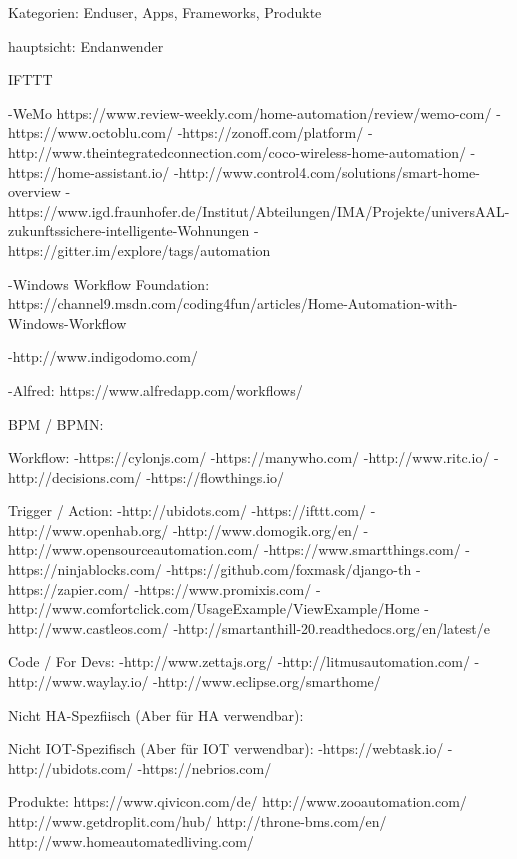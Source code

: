 Kategorien: Enduser, Apps, Frameworks, Produkte

hauptsicht: Endanwender

IFTTT


-WeMo https://www.review-weekly.com/home-automation/review/wemo-com/
-https://www.octoblu.com/
-https://zonoff.com/platform/
-http://www.theintegratedconnection.com/coco-wireless-home-automation/
-https://home-assistant.io/
-http://www.control4.com/solutions/smart-home-overview
-https://www.igd.fraunhofer.de/Institut/Abteilungen/IMA/Projekte/universAAL-zukunftssichere-intelligente-Wohnungen 
-https://gitter.im/explore/tags/automation

-Windows Workflow Foundation: https://channel9.msdn.com/coding4fun/articles/Home-Automation-with-Windows-Workflow


-http://www.indigodomo.com/

-Alfred: https://www.alfredapp.com/workflows/

BPM / BPMN:

Workflow:
-https://cylonjs.com/
-https://manywho.com/
-http://www.ritc.io/
-http://decisions.com/
-https://flowthings.io/

Trigger / Action:
-http://ubidots.com/
-https://ifttt.com/
-http://www.openhab.org/
-http://www.domogik.org/en/
-http://www.opensourceautomation.com/
-https://www.smartthings.com/
-https://ninjablocks.com/
-https://github.com/foxmask/django-th
-https://zapier.com/
-https://www.promixis.com/
-http://www.comfortclick.com/UsageExample/ViewExample/Home
-http://www.castleos.com/
-http://smartanthill-20.readthedocs.org/en/latest/e

Code / For Devs:
-http://www.zettajs.org/
-http://litmusautomation.com/
-http://www.waylay.io/
-http://www.eclipse.org/smarthome/

Nicht HA-Spezfiisch (Aber für HA verwendbar):

Nicht IOT-Spezifisch (Aber für IOT verwendbar):
-https://webtask.io/
-http://ubidots.com/
-https://nebrios.com/

Produkte:
https://www.qivicon.com/de/
http://www.zooautomation.com/
http://www.getdroplit.com/hub/
http://throne-bms.com/en/
http://www.homeautomatedliving.com/
